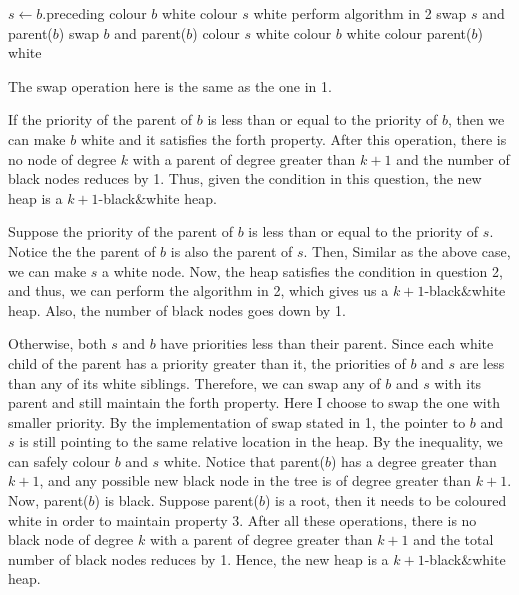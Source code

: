 \documentclass[10pt]{article}
\begin{document}
\begin{enumerate}
		\begin{algorithmic}[1]
			\State $s \gets b$.preceding
				\State colour $b$ white
				\State colour $s$ white
				\State perform algorithm in 2
			\Else
					\State swap $s$ and parent($b$)
				\Else
					\State swap $b$ and parent($b$)
				\EndIf
				\State colour $s$ white
				\State colour $b$ white
					\State colour parent($b$) white
				\EndIf
			\EndIf
		\end{algorithmic}

		The swap operation here is the same as the one in 1.

		If the priority of the parent of $b$ is less than or equal to the
		priority of $b$, then we can make $b$ white and it satisfies the forth
		property.
		After this operation, there is no node of degree $k$ with a parent of
		degree greater than $k+1$ and the number of black nodes reduces by 1.
		Thus, given the condition in this question, the new heap is a
		$k+1$-black$\&$white heap. 

		Suppose the priority of the parent of $b$ is less than or equal to the
		priority of $s$.
		Notice the the parent of $b$ is also the parent of $s$.
		Then, Similar as the above case, we can make $s$ a white node. 
		Now, the heap satisfies the condition in question 2, and thus, we can
		perform the algorithm in 2, which gives us a $k+1$-black$\&$white heap.
		Also, the number of black nodes goes down by 1.

		Otherwise, both $s$ and $b$ have priorities less than their parent.
		Since each white child of the parent has a priority greater than it,
		the priorities of $b$ and $s$ are less than any of its white siblings.
		Therefore, we can swap any of $b$ and $s$ with its parent and still
		maintain the forth property. 
		Here I choose to swap the one with smaller priority.
		By the implementation of swap stated in 1, the pointer to $b$ and $s$ is still
		pointing to the same relative location in the heap.
		By the inequality, we can safely colour $b$ and $s$ white. 
		Notice that parent($b$) has a degree greater than $k+1$, and any
		possible new black node in the tree is of degree greater than $k+1$.
		Now, parent($b$) is black. 
		Suppose parent($b$) is a root, then it needs to be coloured white in
		order to maintain property 3.
		After all these operations, there is no black node of degree $k$ with a
		parent of degree greater than $k+1$ and the total number of black nodes
		reduces by 1. 
		Hence, the new heap is a $k+1$-black$\&$white heap.


\end{enumerate}
\end{document}

